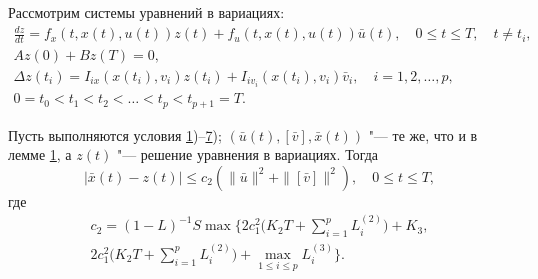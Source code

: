 \smallskip

Рассмотрим системы уравнений в вариациях:
\begin{gather} \label{sha:35} 
\frac{dz}{dt} =f_{x}(t,x(t),u(t))z(t)+f_{u}(t,x(t),u(t))\bar{u}(t),\quad 0\le t\le T,\quad t\ne t_{i},  
\\
 \label{sha:36} 
Az(0)+Bz(T)=0, 
\\
 \label{sha:37} 
{\Delta z(t_{i})=I_{ix}(x(t_{i}),v_{i})z(t_{i})+I_{iv_{i}}(x(t_{i}),v_{i})\bar{v}_{i} ,\quad i=1, 2, \dots, p, } 
\\
0=t_{0}<t_{1}<t_{2}<\dots<t_{p}<t_{p+1}=T.
\end{gather} 

\smallskip

\hypertarget{sha:lemma:2)}{}
\begin{lemma}[2]Пусть выполняются условия {\rm \hyperlink{sha:1)}{1})--\hyperlink{sha:7)}{7});}  $(\bar{u}(t),[\bar{v}],\bar{x}(t))$ "--- те же{\rm ,} что и в лемме {\rm \hyperlink{sha:lemma:1)}{1},} а $z(t)$ "--- решение уравнения в вариациях{\rm .} Тогда
\begin{equation} \label{sha:38} 
|\bar{x}(t)-z(t)|\le c_{2}(\| \bar{u}\|^{2} +\|[\bar{v}]\| ^{2}), \quad 0\le t\le T, 
\end{equation} 
где \begin{multline*}
c_{2}=(1-L)^{-1}S  \max\biggl\{2c_{1}^{2}\biggl(K_{2}T+\sum\limits_{i=1}^{p}L_{i}^{(2)}\biggr) 
+ K_{3}, \\ 
2c_{1}^{2}\biggl(K_{2}T+\sum\limits_{i=1}^{p}L_{i}^{(2)}\biggr)+\mathop{\max}\limits_{1\le i\le p}L_{i}^{(3)}\biggr\}.
\end{multline*}
\end{lemma}

